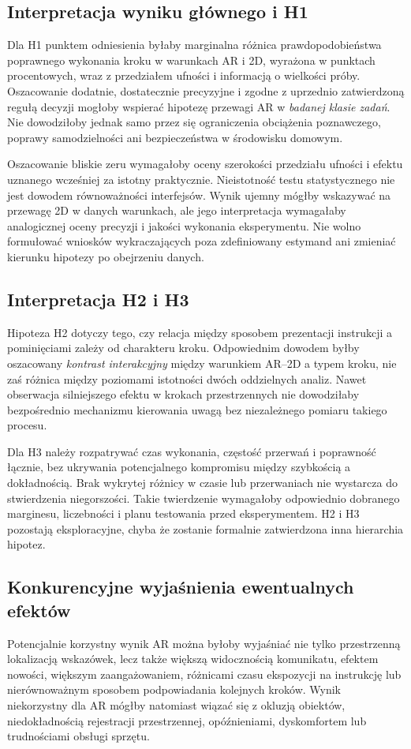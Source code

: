\documentclass[11pt,a4paper]{article}
\begin{document}
\subsection{Interpretacja wyniku głównego i H1}
Dla H1 punktem odniesienia byłaby marginalna różnica prawdopodobieństwa poprawnego wykonania kroku w warunkach AR i 2D, wyrażona w punktach procentowych, wraz z przedziałem ufności i informacją o wielkości próby. Oszacowanie dodatnie, dostatecznie precyzyjne i zgodne z uprzednio zatwierdzoną regułą decyzji mogłoby wspierać hipotezę przewagi AR w \emph{badanej klasie zadań}. Nie dowodziłoby jednak samo przez się ograniczenia obciążenia poznawczego, poprawy samodzielności ani bezpieczeństwa w środowisku domowym.

Oszacowanie bliskie zeru wymagałoby oceny szerokości przedziału ufności i efektu uznanego wcześniej za istotny praktycznie. Nieistotność testu statystycznego nie jest dowodem równoważności interfejsów. Wynik ujemny mógłby wskazywać na przewagę 2D w danych warunkach, ale jego interpretacja wymagałaby analogicznej oceny precyzji i jakości wykonania eksperymentu. Nie wolno formułować wniosków wykraczających poza zdefiniowany estymand ani zmieniać kierunku hipotezy po obejrzeniu danych.

\subsection{Interpretacja H2 i H3}
Hipoteza H2 dotyczy tego, czy relacja między sposobem prezentacji instrukcji a pominięciami zależy od charakteru kroku. Odpowiednim dowodem byłby oszacowany \emph{kontrast interakcyjny} między warunkiem AR--2D a typem kroku, nie zaś różnica między poziomami istotności dwóch oddzielnych analiz. Nawet obserwacja silniejszego efektu w krokach przestrzennych nie dowodziłaby bezpośrednio mechanizmu kierowania uwagą bez niezależnego pomiaru takiego procesu.

Dla H3 należy rozpatrywać czas wykonania, częstość przerwań i poprawność łącznie, bez ukrywania potencjalnego kompromisu między szybkością a dokładnością. Brak wykrytej różnicy w czasie lub przerwaniach nie wystarcza do stwierdzenia niegorszości. Takie twierdzenie wymagałoby odpowiednio dobranego marginesu, liczebności i planu testowania przed eksperymentem. H2 i H3 pozostają eksploracyjne, chyba że zostanie formalnie zatwierdzona inna hierarchia hipotez.

\subsection{Konkurencyjne wyjaśnienia ewentualnych efektów}
Potencjalnie korzystny wynik AR można byłoby wyjaśniać nie tylko przestrzenną lokalizacją wskazówek, lecz także większą widocznością komunikatu, efektem nowości, większym zaangażowaniem, różnicami czasu ekspozycji na instrukcję lub nierównoważnym sposobem podpowiadania kolejnych kroków. Wynik niekorzystny dla AR mógłby natomiast wiązać się z okluzją obiektów, niedokładnością rejestracji przestrzennej, opóźnieniami, dyskomfortem lub trudnościami obsługi sprzętu.
\end{document}
